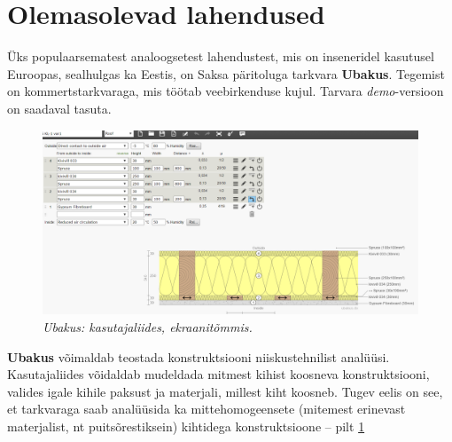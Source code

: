 \section{Olemasolevad lahendused}
\label{chapters:problem_statement_existing_solutions}
Üks populaarsematest analoogsetest lahendustest, mis on inseneridel kasutusel Euroopas, sealhulgas ka Eestis, on Saksa päritoluga tarkvara \textbf{Ubakus}. 
Tegemist on kommertstarkvaraga, mis töötab veebirkenduse kujul. Tarvara \textit{demo}-versioon on saadaval tasuta.
\begin{figure}[ht]
    \centering
    \includegraphics[width=.8\textwidth]{figures/problem_statement/01_ubakus.png}
    \caption[Ubakus tarkvara katutajaliides, ekraanitõmmis]{\textit{Ubakus: kasutajaliides, ekraanitõmmis.}}
    \label{fig:ubakus_sample}
\end{figure}

\textbf{Ubakus} võimaldab teostada konstruktsiooni niiskustehnilist analüüsi. Kasutajaliides võidaldab 
mudeldada mitmest kihist koosneva konstruktsiooni, valides igale kihile paksust ja materjali, millest 
kiht koosneb. Tugev eelis on see, et tarkvaraga saab analüüsida ka mittehomogeensete (mitemest erinevast 
materjalist, nt puitsõrestiksein) kihtidega konstruktsioone -- pilt \ref{fig:ubakus_sample}

